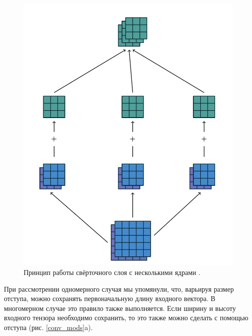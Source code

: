 \documentclass[12pt, fleqn]{article}
\begin{document}
    \begin{figure}[ht]
        \centering
        \includegraphics[scale=0.5]{pics/conv_channels.png}
        \caption{Принцип работы свёрточного слоя с несколькими ядрами \cite{dumoulin2016guide}.}
        \label{conv_channels}
    \end{figure}
        
    При рассмотрении одномерного случая мы упомянули, что, варьируя размер отступа, можно сохранять
    первоначальную длину входного вектора. В многомерном случае это правило также выполняется. Если 
    ширину и высоту входного тензора необходимо сохранить, то это также можно сделать с помощью 
    отступа (рис. \ref{conv_mods}a).
\end{document}
